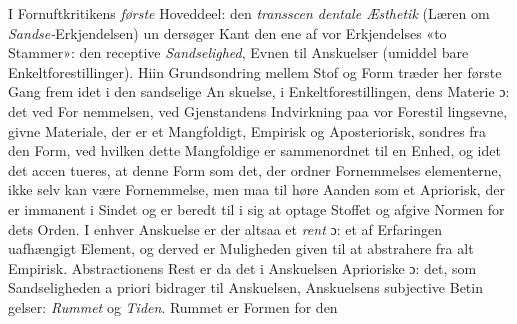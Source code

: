 \documentclass[12pt,a4paper]{book}
\begin{document}
I Fornuftkritikens \emph{første} Hoveddeel: den \emph{transscen\-%
dentale Æsthetik} (Læren om \emph{Sandse-}Erkjendelsen) un\-%
dersøger Kant den ene af vor Erkjendelses «to Stammer»:
den receptive \emph{Sandselighed}, Evnen til Anskuelser (umiddel\-%
bare Enkeltforestillinger). Hiin Grundsondring mellem Stof og
Form træder her første Gang frem idet i den sandselige An\-%
skuelse, i Enkeltforestillingen, dens Materie ɔ: det ved For\-%
nemmelsen, ved Gjenstandens Indvirkning paa vor Forestil\-%
lingsevne, givne Materiale, der er et Mangfoldigt, Empirisk
og Aposteriorisk, sondres fra den Form, ved hvilken dette
Mangfoldige er sammenordnet til en Enhed, og idet det accen\-%
tueres, at denne Form som det, der ordner Fornemmelses\-%
elementerne, ikke selv kan være Fornemmelse, men maa til\-%
høre Aanden som et Apriorisk, der er immanent i Sindet og
er beredt til i sig at optage Stoffet og afgive Normen for
dets Orden. I enhver Anskuelse er der altsaa et \emph{rent} ɔ: et
af Erfaringen uafhængigt Element, og derved er Muligheden
given til at abstrahere fra alt Empirisk. Abstractionens Rest
er da det i Anskuelsen Aprioriske ɔ: det, som Sandseligheden
a priori bidrager til Anskuelsen, Anskuelsens subjective Betin\-%
gelser: \emph{Rummet} og \emph{Tiden}. Rummet er Formen for den
\end{document}
